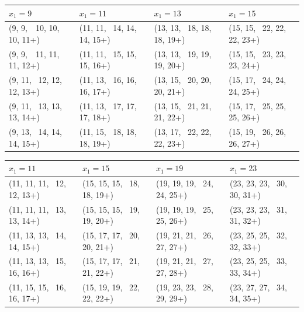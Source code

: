 \documentclass[10pt]{article}
\theoremstyle{definition}
\begin{document}
\begin{center}
\footnotesize
\begin{tabular}{|l|l|l|l|}
\hline
$x_1 = 9$ & $x_1 = 11$ & $x_1 = 13$ & $x_1 = 15$\\
\hline
(9, 9, \,\;\, 10, 10, 10, 11+)& (11, 11, \, 14, 14, 14, 15+) & (13, 13, \, 18, 18, 18, 19+) & (15, 15, \, 22, 22, 22, 23+)\\ 
(9, 9,\, \;\, 11, 11, 11, 12+) & (11, 11, \, 15, 15, 15, 16+)& (13, 13, \, 19, 19, 19, 20+) & (15, 15, \, 23, 23, 23, 24+)\\
(9, 11, \, 12, 12, 12, 13+)& (11, 13, \, 16, 16, 16, 17+)& (13, 15, \, 20, 20, 20, 21+)& (15, 17, \, 24, 24, 24, 25+) \\
(9, 11, \, 13, 13, 13, 14+)& (11, 13, \, 17, 17, 17, 18+) & (13, 15, \, 21, 21, 21, 22+)& (15, 17, \, 25, 25, 25, 26+) \\
(9, 13, \, 14, 14, 14, 15+)& (11, 15, \, 18, 18, 18, 19+)& (13, 17, \, 22, 22, 22, 23+)& (15, 19, \, 26, 26, 26, 27+) \\
\hline
\end{tabular}
\end{center}

\begin{center}
\footnotesize
\begin{tabular}{|l|l|l|l|}
\hline
$x_1 = 11$ & $x_1 = 15$ & $x_1 = 19$ & $x_1 = 23$\\
\hline
(11, 11, 11, \, 12, 12, 13+)& (15, 15, 15, \, 18, 18, 19+) & (19, 19, 19, \, 24, 24, 25+)& (23, 23, 23, \, 30, 30, 31+)  \\
(11, 11, 11, \, 13, 13, 14+) & (15, 15, 15, \, 19, 19, 20+)& (19, 19, 19, \, 25, 25, 26+)& (23, 23, 23, \, 31, 31, 32+) \\
(11, 13, 13, \, 14, 14, 15+) & (15, 17, 17, \, 20, 20, 21+) & (19, 21, 21, \, 26, 27, 27+)& (23, 25, 25, \, 32, 32, 33+)  \\
(11, 13, 13, \, 15, 16, 16+)& (15, 17, 17, \, 21, 21, 22+)& (19, 21, 21, \, 27, 27, 28+)& (23, 25, 25, \, 33, 33, 34+) \\
(11, 15, 15, \, 16, 16, 17+)& (15, 19, 19, \, 22, 22, 22+)&  (19, 23, 23, \, 28, 29, 29+)& (23, 27, 27, \, 34, 34, 35+) \\
\hline
\end{tabular}
\end{center}
\end{document}
